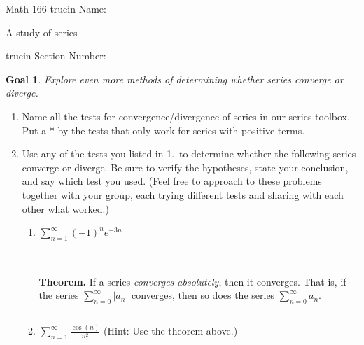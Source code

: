\documentclass[12pt]{article}
\newtheorem*{goal}{Goal}
\begin{document}
\pagestyle{empty} %

\noindent
{Math 166   truein  Name:\ \hrulefill}

\noindent
{A study of series}

\noindent  {} truein  Section Number:\ \hrulefill
\medskip

\begin{goal} \rm
Explore even more methods of determining whether series converge or diverge. 
\end{goal}

\begin{enumerate}
\item Name all the tests for convergence/divergence of series in our series toolbox. Put a * by the tests that only work for series with positive terms.
\vfill

\item Use any of the tests you listed in 1.\ to determine whether the following series converge or diverge. Be sure to verify the hypotheses, state your conclusion, and say which test you used. (Feel free to approach to these problems together with your group, each trying different tests and sharing with each other what worked.)
\begin{enumerate}
\item $\displaystyle\sum_{n=1}^{\infty} (-1)^n e^{-3n}$

\vfill
\newpage

%
\hrule\ \\
{\bf Theorem.} If a series \emph{converges absolutely}, then it converges.  That is, if the series $\sum_{n = 0}^\infty |a_n|$ converges, then so does the series $\sum_{n = 0}^\infty a_n$.\\
\hrule
\item $\displaystyle\sum_{n=1}^{\infty} \frac{\cos(n)}{n^2}$ (Hint: Use the theorem above.)


\end{enumerate}
\end{enumerate}
\end{document}
